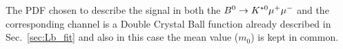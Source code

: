 The PDF chosen to describe the signal in both the ${{B}^0} \rightarrow{\ensuremath{{K}^{*0}}}{\ensuremath{\mu^+\mu^-}}$ and the corresponding
\jpsi channel is a Double Crystal Ball function already described in Sec.~\ref{sec:Lb_fit} and also
in this case the mean value ($m_0$) is kept in common.








